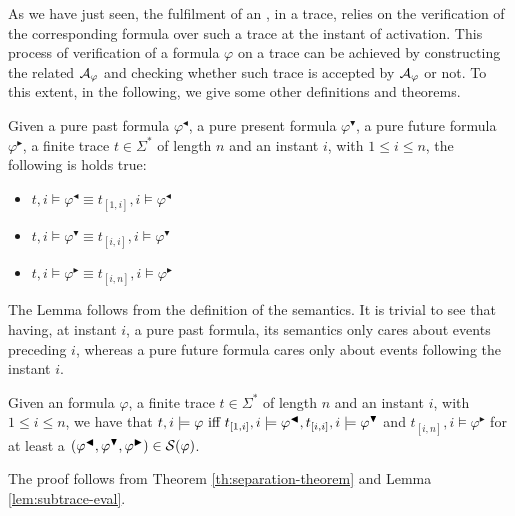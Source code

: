 As we have just seen, the fulfilment of an \rcon\xspace, in a trace, relies on the verification of the corresponding \LTLp formula over such a trace at the instant of activation. This process of verification of a formula $\varphi$ on a trace can be achieved by constructing the related \DFA $\automaton_{\varphi}$ and checking whether such trace is accepted by $\automaton_{\varphi}$ or not. To this extent, in the following, we give some other definitions and theorems.

\begin{lemma}\label{lem:subtrace-eval}
Given a pure past formula $\varphi^\blacktriangleleft$, a pure present formula $\varphi^\blacktriangledown$, a pure future formula $\varphi^\blacktriangleright$, a finite trace $t \in \Sigma^*$ of length $n$ and an instant $i$, with $1 \le i \le n$, the following is holds true:
\begin{itemize}
\item $t,i \models \varphi^\blacktriangleleft \equiv t_{[1,i]}, i \models \varphi^\blacktriangleleft$
\item $t,i \models \varphi^\blacktriangledown \equiv t_{[i,i]}, i \models \varphi^\blacktriangledown$
\item $t,i \models \varphi^\blacktriangleright \equiv t_{[i,n]}, i \models \varphi^\blacktriangleright$
\end{itemize}
\end{lemma}
The Lemma follows from the definition of the \LTLp semantics. It is trivial to see that having, at instant $i$, a pure past formula, its semantics only cares about events preceding $i$, whereas a pure future formula cares only about events following the instant $i$.
\begin{theorem}\citep{cecconi2018interestingness}\label{th:sepformulas-eval}
Given an \LTLp formula $\varphi$, a finite trace $t \in \Sigma^*$ of length $n$ and an instant $i$, with $1 \le i \le n$, we have that $t,i \models \varphi \tiff t_{[1,i]}, i \models \varphi^\blacktriangleleft, t_{[i,i]}, i \models \varphi^\blacktriangledown$ and $t_{[i,n]}, i \models \varphi^\blacktriangleright$ for at least a $(\varphi^{\blacktriangleleft},\varphi^{\blacktriangledown},\varphi^{\blacktriangleright}) \in \S(\varphi)$.
\end{theorem}
The proof follows from Theorem \ref{th:separation-theorem} and Lemma \ref{lem:subtrace-eval}.

